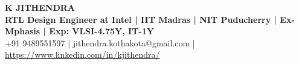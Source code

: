 \documentclass[a4paper,11pt]{article}
\begin{document}
\begin{center}
\LARGE { \uppercase {\textbf{K Jithendra}}}\\
\large \textbf{{RTL Design Engineer at Intel | IIT Madras | NIT Puducherry | Ex-Mphasis | Exp: VLSI-4.75Y, IT-1Y}}\\
\large {+91 9489551597 | jithendra.kothakota@gmail.com | \href{https://www.linkedin.com/in/kjithendra/}{https://www.linkedin.com/in/kjithendra/}} \\
\end{center}



\end{document}
